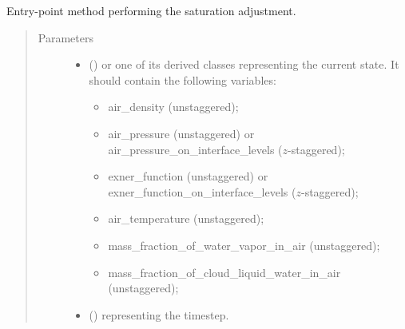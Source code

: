 \documentclass[letterpaper,10pt,english]{sphinxmanual}
\begin{document}
\begin{fulllineitems}
\begin{quote}
\begin{description}
\begin{itemize}
\end{itemize}

\end{description}\end{quote}

\begin{fulllineitems}
\label{\detokenize{api:parameterizations.adjustment_microphysics_kessler_wrf_saturation.AdjustmentMicrophysicsKesslerWRFSaturation.__call__}}
Entry-point method performing the saturation adjustment.
\begin{quote}\begin{description}
\item[{Parameters}] \leavevmode\begin{itemize}
\item {} 
 () \textendash{} 
{\hyperref[\detokenize{api:storages.grid_data.GridData}]{}} or one of its derived classes representing the current state.
It should contain the following variables:
\begin{itemize}
\item {} 
air\_density (unstaggered);

\item {} 
air\_pressure (unstaggered) or air\_pressure\_on\_interface\_levels (\(z\)-staggered);

\item {} 
exner\_function (unstaggered) or exner\_function\_on\_interface\_levels (\(z\)-staggered);

\item {} 
air\_temperature (unstaggered);

\item {} 
mass\_fraction\_of\_water\_vapor\_in\_air (unstaggered);

\item {} 
mass\_fraction\_of\_cloud\_liquid\_water\_in\_air (unstaggered);

\end{itemize}


\item {} 
 () \textendash{}  representing the timestep.


\end{itemize}
\end{description}
\end{quote}
\end{fulllineitems}
\end{fulllineitems}
\end{document}
